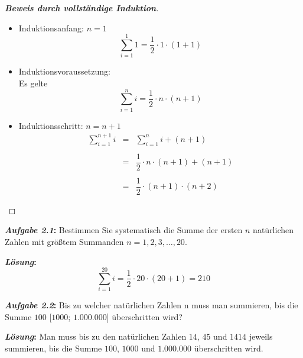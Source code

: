 \begin{proof}[\textbf{Beweis durch vollständige Induktion}]
 $\text{}$
 
 \begin{itemize}
  \item Induktionsanfang: $n = 1$
        \[
         \sum_{i=1}^{1} 1 = \frac{1}{2} \cdot 1 \cdot (1+1)
        \]
  \item Induktionsvoraussetzung:\\  
        Es gelte
        \[
         \sum_{i=1}^{n} i = \frac{1}{2} \cdot n \cdot (n+1)
        \]
  \item Induktionsschritt: $n = n + 1$
        \[
         \begin{array}{rcl}
           \sum\limits_{i=1}^{n+1} i
           & = & \sum\limits_{i=1}^{n} i + (n+1) \\\\
           & = & \dfrac{1}{2} \cdot n \cdot (n+1) + (n+1) \\\\
           & = & \dfrac{1}{2} \cdot (n+1) \cdot (n+2)
         \end{array}
        \]
 \end{itemize}
\end{proof}

\textbf{\textit{Aufgabe 2.1}:}
Bestimmen Sie systematisch die Summe der ersten $n$ natürlichen
Zahlen mit größtem Summanden $n = 1, 2, 3, \dots, 20$.

\textbf{\textit{Lösung}:}
\[
  \sum_{i=1}^{20} i = \frac{1}{2} \cdot 20 \cdot (20+1) = 210
\]


\textbf{\textit{Aufgabe 2.2}:}
Bis zu welcher natürlichen Zahlen n muss man summieren,
bis die Summe $100$ [$1000$; $1.000.000$] überschritten wird?

\textbf{\textit{Lösung}:}
Man muss bis zu den natürlichen Zahlen $14$, $45$
und $1414$ jeweils summieren, bis die Summe $100$, $1000$
und $1.000.000$ überschritten wird.








